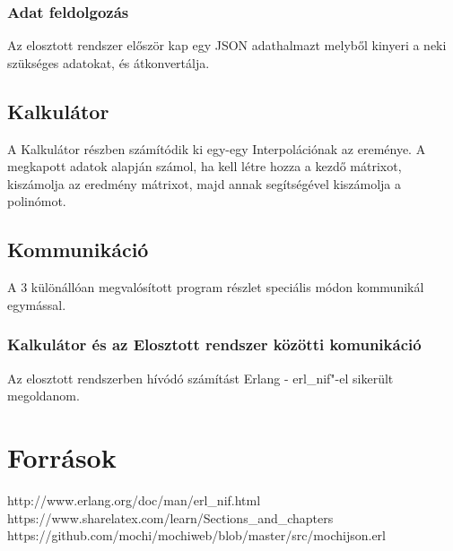 \documentclass{elteikthesis}
\begin{document}
\subsection{Adat feldolgozás}
Az elosztott rendszer először kap egy JSON adathalmazt melyből kinyeri a neki szükséges adatokat, és átkonvertálja.

\section{Kalkulátor}
A Kalkulátor részben számítódik ki egy-egy Interpolációnak az ereménye.
A megkapott adatok alapján számol, ha kell létre hozza a kezdő mátrixot, kiszámolja az eredmény mátrixot, majd annak segítségével kiszámolja a polinómot.

\section{Kommunikáció}
A 3 különállóan megvalósított program részlet speciális módon kommunikál egymással. 
\subsection{Kalkulátor és az Elosztott rendszer közötti komunikáció} 
Az elosztott rendszerben hívódó számítást Erlang - erl_nif"-el sikerült megoldanom. 

\chapter{Források}
http://www.erlang.org/doc/man/erl_nif.html
https://www.sharelatex.com/learn/Sections_and_chapters
https://github.com/mochi/mochiweb/blob/master/src/mochijson.erl
\end{document}
